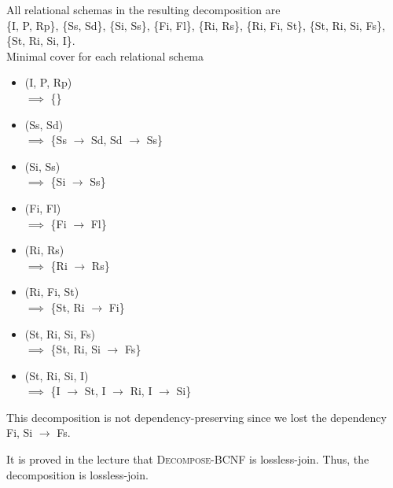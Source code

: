 \documentclass[12pt]{article}
\begin{document}
\begin{enumerate}
        All relational schemas in the resulting decomposition are \\
        \{I, P, Rp\}, \{Ss, Sd\}, \{Si, Ss\}, \{Fi, Fl\}, \{Ri, Rs\}, \{Ri, Fi,
        St\}, \{St, Ri, Si, Fs\}, \{St, Ri, Si, I\}. \\

        Minimal cover for each relational schema
        \begin{itemize}
          \item (I, P, Rp) \\
                $\implies$ \{\}
          \item (Ss, Sd) \\
                $\implies$ \{Ss $\longrightarrow$ Sd, Sd $\longrightarrow$ Ss\}
          \item (Si, Ss) \\
                $\implies$ \{Si $\longrightarrow$ Ss\}
          \item (Fi, Fl) \\
                $\implies$ \{Fi $\longrightarrow$ Fl\}
          \item (Ri, Rs) \\
                $\implies$ \{Ri $\longrightarrow$ Rs\}
          \item (Ri, Fi, St) \\
                $\implies$ \{St, Ri $\longrightarrow$ Fi\}
          \item (St, Ri, Si, Fs) \\
                $\implies$ \{St, Ri, Si $\longrightarrow$ Fs\}
          \item (St, Ri, Si, I) \\
                $\implies$ \{I $\longrightarrow$ St, I $\longrightarrow$ Ri, I
                            $\longrightarrow$ Si\}
        \end{itemize}

        This decomposition is not dependency-preserving since we lost the
        dependency Fi, Si $\longrightarrow$ Fs.

        It is proved in the lecture that \textsc{Decompose-BCNF} is
        lossless-join. Thus, the decomposition is lossless-join.


\end{enumerate}
\end{document}
